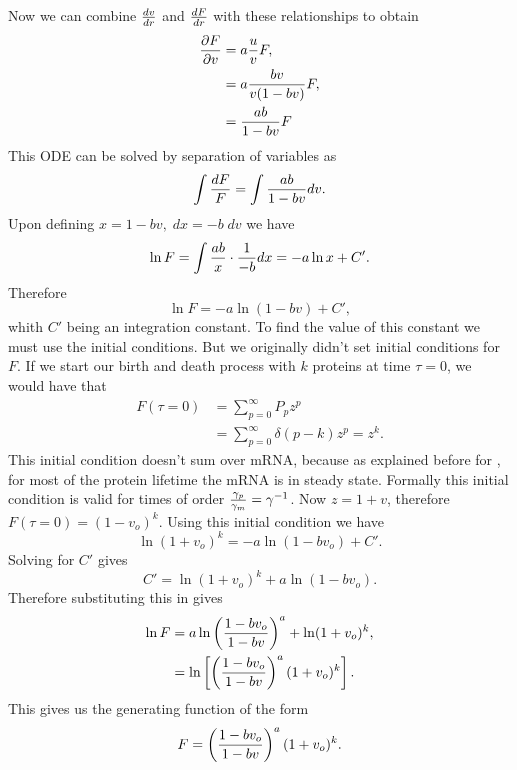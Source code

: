 Now we can combine ${dv \over dr}$ and ${dF \over dr}$ with these relationships
to obtain
\begin{align}
  {\partial F \over \partial v} &= a {u \over v} F, \\
  &= a {b v \over v (1 - b v)} F, \\
  &= {a b \over 1 - b v} F
\end{align}
This ODE can be solved by separation of variables as
\begin{equation}
  \int {dF \over F} = \int {a b \over 1 - b v} dv.
\end{equation}
Upon defining $x = 1 - b v, \; dx = - b\; dv$ we have
\begin{equation}
  \ln F = \int {a b \over x} \cdot {1 \over -b} dx = -a \ln x + C'.
\end{equation}
Therefore
\begin{equation}
  \ln F = -a \ln (1 - b v) + C',
  \label{eq_lnF_constant}
\end{equation}
whith $C'$ being an integration constant. To find the value of this constant
we must use the initial conditions. But we originally didn't set initial
conditions for $F$. If we start our birth and death process with $k$ proteins
at time $\tau = 0$, we would have that
\begin{align}
  F(\tau = 0) &= \sum_{p=0}^{\infty}P_p z^p\\
  &= \sum_{p=0}^{\infty} \delta (p - k) z^p = z^k.
\end{align}
This initial condition doesn't sum over mRNA, because as explained before for
\eref[eq_SI_31_uofv], for most of the protein lifetime the mRNA is in steady
state. Formally this initial condition is valid for times of order
${\gamma_p \over \gamma_m} = \gamma^{-1}$. Now $z = 1 + v$, therefore
$F(\tau = 0) = (1 - v_o)^k$. Using this initial condition we have
\begin{equation}
  \ln (1 + v_o)^k = -a \ln (1 - b v_o) + C'.
\end{equation}
Solving for $C'$ gives
\begin{equation}
  C' = \ln (1 + v_o)^k + a \ln (1 - b v_o).
\end{equation}
Therefore substituting this in  gives
\begin{align}
  \ln F &= a \ln \left( {1 - b v_o \over 1 - b v} \right)^a
  + \ln (1 + v_o)^k,\\
  &= \ln \left[ \left( {1 - b v_o \over 1 - b v} \right)^a
  (1 + v_o)^k \right].
\end{align}
This gives us the generating function of the form
\begin{equation}
  F =   \left( {1 - b v_o \over 1 - b v} \right)^a
  (1 + v_o)^k .
  \label{eq_generating_function_onv}
\end{equation}


